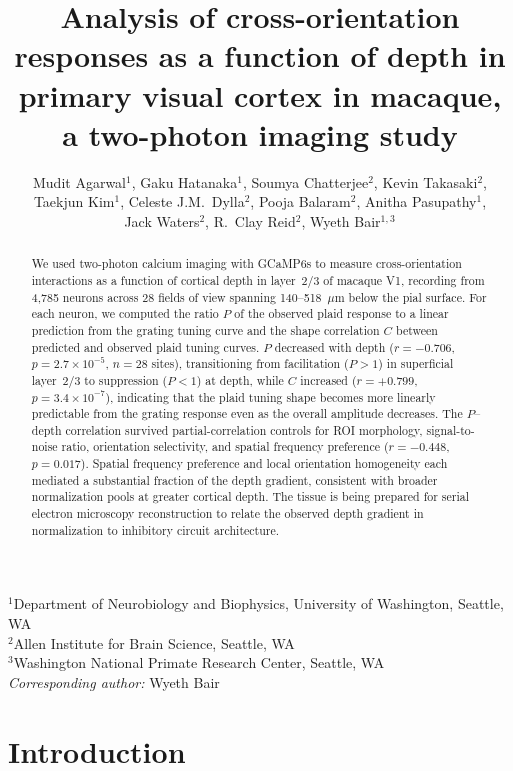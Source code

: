 \documentclass[11pt,letterpaper]{article}
\title{Analysis of cross-orientation responses as a function of depth in
primary visual cortex in macaque, a two-photon imaging study}
\author{
  Mudit Agarwal$^{1}$,
  Gaku Hatanaka$^{1}$,
  Soumya Chatterjee$^{2}$,
  Kevin Takasaki$^{2}$, \\
  Taekjun Kim$^{1}$,
  Celeste J.M.\ Dylla$^{2}$,
  Pooja Balaram$^{2}$,
  Anitha Pasupathy$^{1}$, \\
  Jack Waters$^{2}$,
  R.\ Clay Reid$^{2}$,
  Wyeth Bair$^{1,3}$
}
\date{}
\begin{document}
\maketitle

\begin{center}
  $^{1}$Department of Neurobiology and Biophysics, University of Washington, Seattle, WA \\
  $^{2}$Allen Institute for Brain Science, Seattle, WA \\
  $^{3}$Washington National Primate Research Center, Seattle, WA \\[1em]
  \textit{Corresponding author:} Wyeth Bair
\end{center}

\vspace{1em}

\begin{abstract}
We used two-photon calcium imaging with GCaMP6s to measure cross-orientation
interactions as a function of cortical depth in layer~2/3 of macaque V1,
recording from 4,785 neurons across 28 fields of view spanning
140--518~$\mu$m below the pial surface. For each neuron, we computed the ratio
$P$ of the observed plaid response to a linear prediction from the grating
tuning curve and the shape correlation $C$ between predicted and observed plaid
tuning curves. $P$ decreased with depth ($r = -0.706$, $p = 2.7 \times
10^{-5}$, $n = 28$ sites), transitioning from facilitation ($P > 1$) in
superficial layer~2/3 to suppression ($P < 1$) at depth, while $C$ increased
($r = +0.799$, $p = 3.4 \times 10^{-7}$), indicating that the plaid tuning
shape becomes more linearly predictable from the grating response even as the
overall amplitude decreases. The $P$--depth correlation survived
partial-correlation controls for ROI morphology, signal-to-noise ratio,
orientation selectivity, and spatial frequency preference ($r = -0.448$,
$p = 0.017$). Spatial frequency preference and local orientation homogeneity
each mediated a substantial fraction of the depth gradient, consistent with
broader normalization pools at greater cortical depth. The tissue is being
prepared for serial electron microscopy reconstruction to relate the observed
depth gradient in normalization to inhibitory circuit architecture.
\end{abstract}

\section{Introduction}
\end{document}
